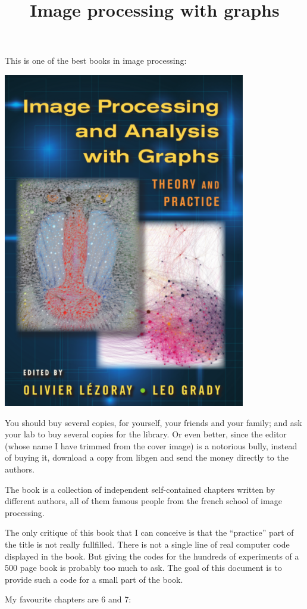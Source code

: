 \title{Image processing with graphs}

This is one of the best books in image processing:

\includegraphics{i/graphcover.png}

You should buy several copies, for yourself, your friends and your family;
and ask your lab to buy several copies for the library.  Or even better,
since the editor (whose name I have trimmed from the cover image) is a
notorious bully, instead of buying it, download a copy from libgen and send
the money directly to the authors.

The book is a collection of independent self-contained chapters written by
different authors, all of them famous people from the french school of image
processing.

The only critique of this book that I can conceive is that the ``practice''
part of the title is not really fullfilled.  There is not a single line of
real computer code displayed in the book.  But giving the codes for the
hundreds of experiments of a 500 page book is probably too much to ask.  The
goal of this document is to provide such a code for a small part of the book.

My favourite chapters are 6 and 7:

